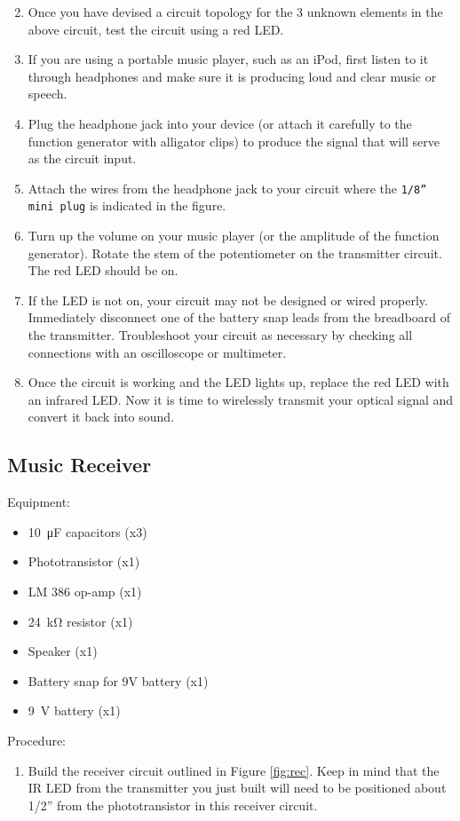 \documentclass[12pt]{../manual}
\begin{document}
\begin{enumerate}
\setcounter{enumi}{1}
\item Once you have devised a circuit topology for the 3 unknown elements in the above circuit, test the circuit using a red LED.
\item If you are using a portable music player, such as an iPod, first listen to it through headphones and make sure it is producing loud and clear music or speech. 
\item Plug the headphone jack into your device (or attach it carefully to the function generator with alligator clips) to produce the signal that will serve as the circuit input.
\item Attach the wires from the headphone jack to your circuit where the {\tt 1/8'' mini plug} is indicated in the figure.
\item Turn up the volume on your music player (or the amplitude of the function generator). Rotate the stem of the potentiometer on the transmitter circuit. The red LED should be on.
\item If the LED is not on, your circuit may not be designed or wired properly. Immediately disconnect one of the battery snap leads from the breadboard of the transmitter. Troubleshoot your circuit as necessary by checking all connections with an oscilloscope or multimeter.
\item Once the circuit is working and the LED lights up, replace the red LED with an infrared LED. Now it is time to wirelessly transmit your optical signal and convert it back into sound.
\end{enumerate}

\newpage
\subsection{Music Receiver}
Equipment:
\begin{itemize}
\item \SI{10}{\micro\farad} capacitors (x3)
\item Phototransistor (x1)
\item LM 386 op-amp (x1)
\item \SI{24}{\kilo\ohm} resistor (x1)
\item Speaker (x1)
\item Battery snap for 9V battery (x1)
\item \SI{9}{\volt} battery (x1)
\end{itemize}

Procedure:
\begin{enumerate}
\item Build the receiver circuit outlined in Figure \ref{fig:rec}. Keep in mind that the IR LED from the transmitter you just built will need to be positioned about 1/2'' from the phototransistor in this receiver circuit. 
\end{enumerate}
\end{document}
